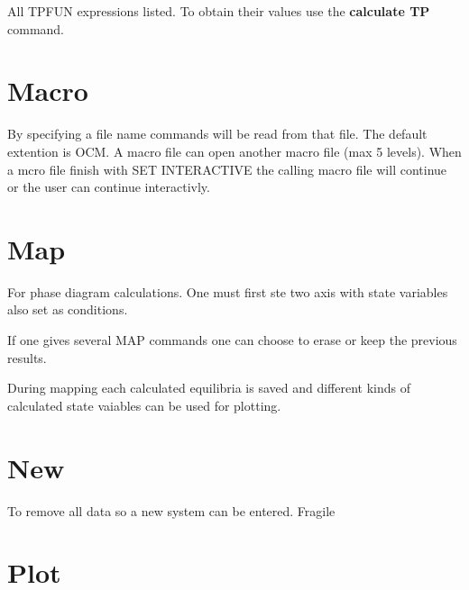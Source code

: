 \documentclass[12pt]{article}
\begin{document}
All TPFUN expressions listed.  To obtain their values use the {\bf
  calculate TP} command.

\section{Macro }

By specifying a file name commands will be read from that file.  The
default extention is OCM.  A macro file can open another macro file
(max 5 levels).  When a mcro file finish with SET INTERACTIVE the
calling macro file will continue or the user can continue
interactivly.

\section{Map }

For phase diagram calculations.  One must first ste two axis with
state variables also set as conditions.

If one gives several MAP commands one can choose to erase or keep the
previous results.

During mapping each calculated equilibria is saved and different kinds
of calculated state vaiables can be used for plotting.

\section{New }

To remove all data so a new system can be entered.  Fragile

\section{Plot }
\end{document}
